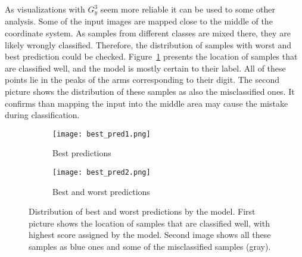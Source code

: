 \documentclass{article}
\begin{document}
\par
As visualizations with $G_{y}^{3}$ seem more reliable it can be used to some other analysis. Some of the input images are mapped close to the middle of the coordinate system. As samples from different classes are mixed there, they are likely wrongly classified. Therefore, the distribution of samples with worst and best prediction could be checked. Figure~\ref{fig:best_pred} presents the location of samples that are classified well, and the model is mostly certain to their label. All of these points lie in the peaks of the arms corresponding to their digit. The second picture shows the distribution of these samples as also the misclassified ones. It confirms than mapping the input into the middle area may cause the mistake during classification.
\begin{figure}[htb]%
    \centering
    \begin{subfigure}[b]{0.48\textwidth}
        \texttt{[image: best\_pred1.png]}
        \caption{Best predictions}
    \end{subfigure}%
    \begin{subfigure}[b]{0.48\textwidth}
        \texttt{[image: best\_pred2.png]}
        \caption{Best and worst predictions}
    \end{subfigure}%
    \caption{Distribution of best and worst predictions by the model. First picture shows the location of samples that are classified well, with highest score assigned by the model. Second image shows all these samples as blue ones and some of the misclassified samples (gray).}%
    \label{fig:best_pred}%
\end{figure}
\end{document}
